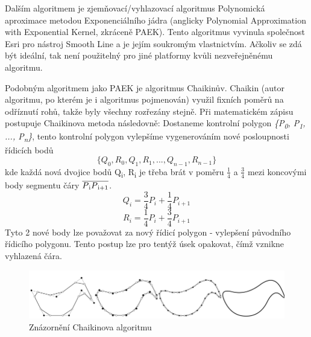 Dalším algoritmem je zjemňovací/vyhlazovací algoritmus Polynomická aproximace metodou Exponenciálního jádra
(anglicky Polynomial Approximation with Exponential Kernel, zkráceně PAEK).
Tento algoritmus vyvinula společnost Esri pro nástroj Smooth Line a je jejím soukromým vlastnictvím.
Ačkoliv se zdá být ideální, tak není použitelný pro jiné platformy kvůli nezveřejněnému algoritmu.

Podobným algoritmem jako PAEK je algoritmus Chaikinův. 
Chaikin (autor algoritmu, po kterém je i algoritmus pojmenován) využil fixních poměrů na odříznutí rohů, takže byly všechny rozřezány stejně. 
Při matematickém zápisu postupuje Chaikinova metoda následovně: Dostaneme kontrolní polygon 
\textit{\{P\textsubscript{0}, P\textsubscript{1}, ..., P\textsubscript{n}\}},
tento kontrolní polygon vylepšíme vygenerováním nové posloupnosti řídicích bodů 
\[ \{Q_0, R_0, Q_1, R_1, ...,  Q_{n−1}, R_{n−1}\} \]                                    
kde každá nová dvojice bodů Q\textsubscript{i}, R\textsubscript{i} je třeba brát v poměru \(\frac{1}{4}\)
a \(\frac{3}{4}\) mezi koncovými body segmentu čáry \(\overline{P\textsubscript{i}P\textsubscript{i+1}}\).
\[Q_i = \frac{3}{4}P_i + \frac{1}{4}P_{i+1}\]
\[R_i = \frac{1}{4}P_i + \frac{3}{4}P_{i+1}\]
Tyto 2 nové body lze považovat za nový řídicí polygon - vylepšení původního řídicího polygonu. 
Tento postup lze pro tentýž úsek opakovat, čímž vznikne vyhlazená čára. \cite{chaikin} 

\begin{figure}[H] \centering
    \includegraphics[width=400pt]{./pictures/chaiken.png}
    \caption[Znázornění Chaikinova algoritmu]{Znázornění Chaikinova algoritmu \cite{bayer-douglas}}
	\label{fig:chaiken}              
\end{figure} 